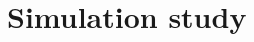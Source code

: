 \documentclass[useAMS, usenatbib, referee]{biom}\usepackage[]{graphicx}\usepackage[]{color}
\begin{document}
\section{Simulation study \label{sec:sim}}



\end{document}
